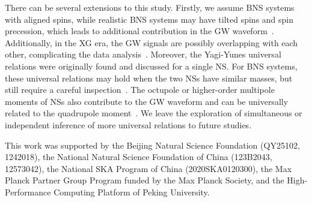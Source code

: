 \documentclass[a4paper,11pt]{article}
\begin{document}
There can be several extensions to this study. Firstly, we assume  BNS systems
with aligned spins, while realistic BNS systems may have tilted spins and spin
precession, which leads to additional contribution in the GW
waveform~\cite{Williamson:2017evr, Purrer:2019jcp, Gamba:2020wgg}. 
Additionally, in the XG era, the GW signals are possibly overlapping with each
other, complicating the data analysis~\cite{Pizzati:2021apa, Samajdar:2021egv,
Wang:2023ldq, Johnson:2024foj, Wang:2025ckw}.  Moreover, the Yagi-Yunes
universal relations were originally found and discussed for a single NS. For BNS
systems, these universal relations may hold when the two NSs have similar
masses, but still require a careful inspection~\cite{Shao:2022koz,
Saffer:2021gak}. The octupole or higher-order multipole moments of NSs also
contribute to the GW waveform and can be universally related to the quadrupole
moment~\cite{Yagi_2017, Abac:2023ujg}.  We leave the exploration of simultaneous
or independent inference of more universal relations to future studies.

\acknowledgments

This work was supported by the Beijing Natural Science Foundation (QY25102,
1242018), the National Natural Science Foundation of China (123B2043, 12573042),
the National SKA Program of China (2020SKA0120300), the Max Planck Partner Group
Program funded by the Max Planck Society, and the High-Performance Computing
Platform of Peking University. 




% 

\end{document}
